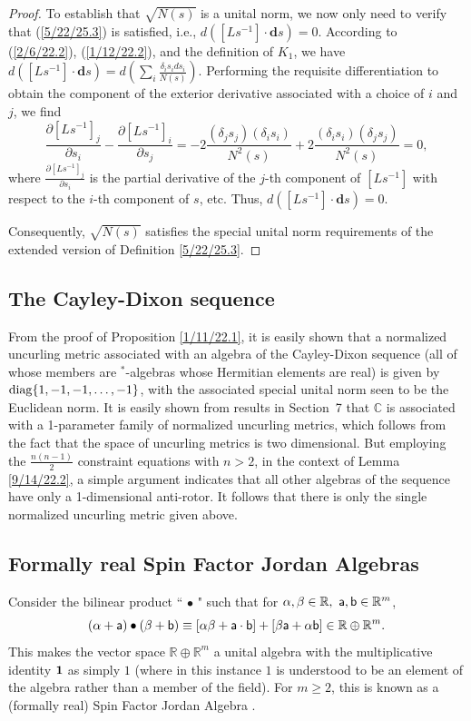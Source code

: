 \documentclass{amsart}
\theoremstyle{definition}
\numberwithin{theorem}{section}
\numberwithin{equation}{section}
\begin{document}
\begin{proof}
 To establish that $\sqrt{N(s)}$ is a unital norm, we  now only need to verify that (\ref{5/22/25.3}) is satisfied, i.e., $d\left([Ls^{-1}]\cdot \mathbf{d}s\right)=0$.  According to (\ref{2/6/22.2}), (\ref{1/12/22.2}), and the definition  of $K_1$, we have $d\left([Ls^{-1}]\cdot \mathbf{d}s\right) = d\left(\sum_i \frac{\delta_is_i ds_i}{N(s)}\right)$.  Performing the requisite differentiation to obtain the component of the exterior derivative associated with a choice of $i$ and $j$, we find \[ \frac{\partial [Ls^{-1}]_j}{\partial s_i} - \frac{\partial [Ls^{-1}]_i}{\partial s_j} = -2\frac{(\delta_j s_j)(\delta_i s_i)}{N^2(s)} +
2\frac{(\delta_i s_i)(\delta_j s_j)}{N^2(s)} = 0,  \] where $\frac{\partial [Ls^{-1}]_j}{\partial s_i}$ is the partial derivative of the $j$-th component of $[Ls^{-1}]$ with respect to the $i$-th component of $s$, etc. Thus,  $d\left([Ls^{-1}]\cdot \mathbf{d}s\right) = 0$.

Consequently, $\sqrt{N(s)}$ satisfies the special unital norm requirements of the extended version of Definition \ref{5/22/25.3}.  
\end{proof}


\subsection{The Cayley-Dixon sequence}  From the proof of Proposition \ref{1/11/22.1}, it is easily shown that a normalized uncurling metric associated with an algebra of the Cayley-Dixon sequence (all of whose members are $^*$-algebras whose Hermitian elements are real) is given by ${\rm diag}\{1,-1,-1,\dots,-1\}$, with the associated special unital norm seen to be the Euclidean norm.  It is easily shown from results in \mbox{Section 7} that $\mathbb{C}$ is associated with a 1-parameter family of normalized uncurling metrics, which follows from the fact that the space of uncurling metrics is two dimensional.  But employing the $\frac{n(n-1)}{2}$ constraint equations with $n>2$, in the context of Lemma \ref{9/14/22.2}, a simple argument indicates that all other algebras of the sequence have only a 1-dimensional anti-rotor.  It follows that there is only the single normalized uncurling metric given above.  
 
\subsection{Formally real Spin Factor Jordan Algebras}  Consider the bilinear product ``$\,\bullet\,$" such that for
$\alpha,\beta\in \mathbb{R},\,\, {\sf a},{\sf b}\in \mathbb{R}^m$,  \begin{equation}  (\alpha+ {\sf a})\bullet (\beta + {\sf b}) \equiv
    [\alpha \beta + {\sf a} \cdot {\sf b}] + [ \beta {\sf a} + \alpha {\sf b}] \in \mathbb{R}\oplus \mathbb{R}^m. \label{12/24/18.1}\end{equation}  This makes the vector space $\mathbb{R}\oplus \mathbb{R}^m$ a unital algebra with the multiplicative identity ${\bf 1}$ as simply $1$ (where in this instance $1$ is understood to be an element of the algebra rather than a member of the field).  For $m\ge 2$, this is known as a (formally real) Spin Factor Jordan Algebra \cite{mccrimmon:2004}.
\end{document}
